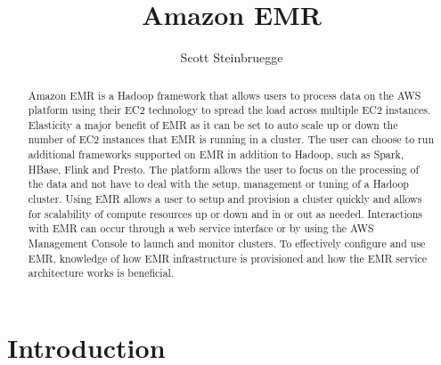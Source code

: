 
\title{Amazon EMR}


\author{Scott Steinbruegge}


\renewcommand{\shortauthors}{S. Steinbruegge}


\begin{abstract}
Amazon EMR is a Hadoop framework that allows users to process data on the AWS 
platform using their EC2 technology to spread the load across multiple EC2 
instances. Elasticity a major benefit of EMR as it can be set to auto scale 
up or down the number of EC2 instances that EMR is running in a cluster. The 
user can choose to run additional frameworks supported on EMR in addition to 
Hadoop, such as Spark, HBase, Flink and Presto. The platform allows the user 
to focus on the processing of the data and not have to deal with the setup, 
management or tuning of a Hadoop cluster. Using EMR allows a user to setup 
and provision a cluster quickly and allows for scalability of compute
resources up or down and in or out as needed. Interactions with EMR can
occur through a web service interface or by using the AWS Management Console
to launch and monitor clusters. To effectively configure and use EMR, 
knowledge of how EMR infrastructure is provisioned and how the EMR service
architecture works is beneficial.  
\end{abstract}


\maketitle

\section{Introduction}

